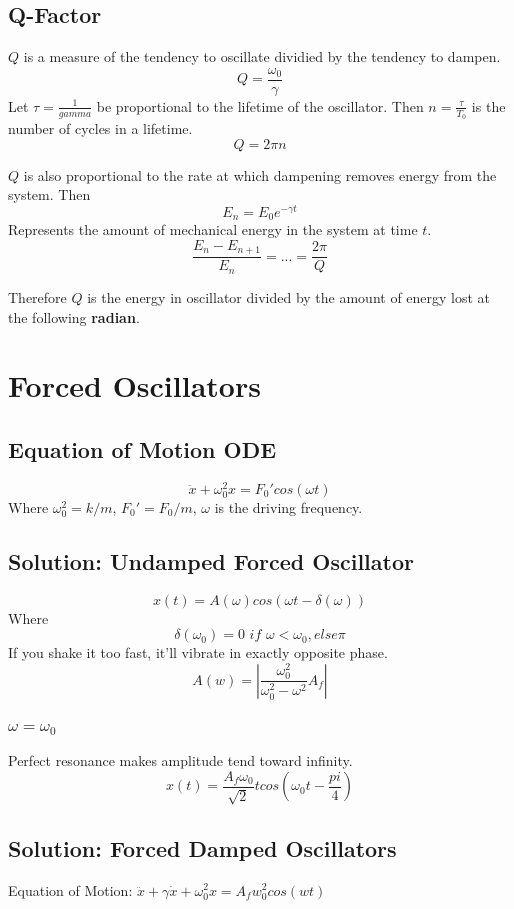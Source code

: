 \documentclass[a4paper,12pt]{report}
\begin{document}
\section{Q-Factor}
$Q$ is a measure of the tendency to oscillate dividied by the tendency to dampen.
$$Q = \frac{\omega_0}{\gamma}$$
Let $\tau = \frac{1}{gamma}$ be proportional to the lifetime of the oscillator. Then 
$n = \frac{\tau}{T_0}$ is the number of cycles in a lifetime.
$$Q = 2\pi n$$


$Q$ is also proportional to the rate at which dampening removes energy from the system. Then
$$E_n = E_0e^{-\gamma t}$$
Represents the amount of mechanical energy in the system at time $t$.
$$\frac{E_n - E_{n+1}}{E_n} = ... = \frac{2\pi}{Q}$$

Therefore $Q$ is the energy in oscillator divided by the amount of energy lost at the
following \textbf{radian}.

\chapter{Forced Oscillators}
\section{Equation of Motion ODE}
$$\ddot{x} + \omega_0^2 x = F_0' cos(\omega t)$$
Where $\omega_0^2 = k/m$, $F_0' = F_0/m$, $\omega$ is the driving frequency.

\section{Solution: Undamped Forced Oscillator}
$$x(t) = A(\omega) cos(\omega t - \delta(\omega))$$
Where
$$\delta(\omega_0) = 0 \,\,if\,\, \omega < \omega_0, else \pi$$
If you shake it too fast, it'll vibrate in exactly opposite phase. 
$$A(w) = |\frac{\omega_0^2}{\omega_0^2 - \omega^2}A_f|$$

\subsection{$\omega = \omega_0$}
Perfect resonance makes amplitude tend toward infinity.
$$x(t) = \frac{A_f \omega_0}{\sqrt{2}} t cos(\omega_0t - \frac{pi}{4})$$

\section{Solution: Forced Damped Oscillators}
Equation of Motion: $\ddot{x} + \gamma \dot{x} + \omega_0^2 x = A_f w_0^2 cos(wt)$
\end{document}
